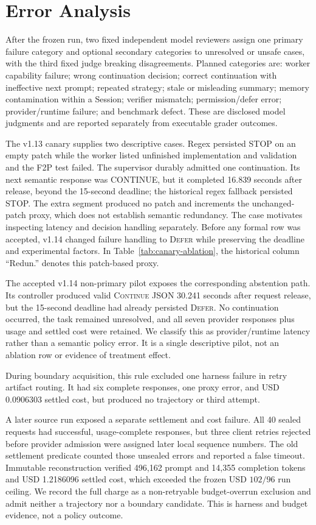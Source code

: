 \documentclass[sigconf,nonacm]{acmart}
\newcommand{\continueaction}{\textsc{Continue}}
\newcommand{\deferaction}{\textsc{Defer}}
\begin{document}
\section{Error Analysis}

After the frozen run, two fixed independent model reviewers assign one primary failure category and optional secondary categories to unresolved or unsafe cases, with the third fixed judge breaking disagreements. Planned categories are: worker capability failure; wrong continuation decision; correct continuation with ineffective next prompt; repeated strategy; stale or misleading summary; memory contamination within a Session; verifier mismatch; permission/defer error; provider/runtime failure; and benchmark defect. These are disclosed model judgments and are reported separately from executable grader outcomes.

The v1.13 canary supplies two descriptive cases. Regex persisted STOP on an empty patch while the worker listed unfinished implementation and validation and the F2P test failed. The supervisor durably admitted one continuation. Its next semantic response was CONTINUE, but it completed 16.839 seconds after release, beyond the 15-second deadline; the historical regex fallback persisted STOP. The extra segment produced no patch and increments the unchanged-patch proxy, which does not establish semantic redundancy. The case motivates inspecting latency and decision handling separately. Before any formal row was accepted, v1.14 changed failure handling to \deferaction{} while preserving the deadline and experimental factors. In Table~\ref{tab:canary-ablation}, the historical column ``Redun.'' denotes this patch-based proxy.

The accepted v1.14 non-primary pilot exposes the corresponding abstention path. Its controller produced valid \continueaction{} JSON 30.241 seconds after request release, but the 15-second deadline had already persisted \deferaction{}. No continuation occurred, the task remained unresolved, and all seven provider responses plus usage and settled cost were retained. We classify this as provider/runtime latency rather than a semantic policy error. It is a single descriptive pilot, not an ablation row or evidence of treatment effect.

During boundary acquisition, this rule excluded one harness failure in retry artifact routing. It had six complete responses, one proxy error, and USD 0.0906303 settled cost, but produced no trajectory or third attempt.

A later source run exposed a separate settlement and cost failure. All 40 sealed requests had successful, usage-complete responses, but three client retries rejected before provider admission were assigned later local sequence numbers. The old settlement predicate counted those unsealed errors and reported a false timeout. Immutable reconstruction verified 496,162 prompt and 14,355 completion tokens and USD 1.2186096 settled cost, which exceeded the frozen USD $102/96$ run ceiling. We record the full charge as a non-retryable budget-overrun exclusion and admit neither a trajectory nor a boundary candidate. This is harness and budget evidence, not a policy outcome.
\end{document}
